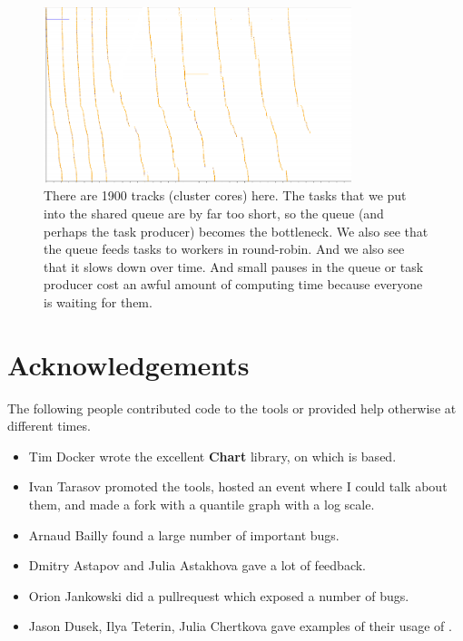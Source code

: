 \documentclass{article}
\begin{document}
\begin{figure}[p]
\center
\includegraphics[width=0.8\textwidth]{pics/splot/spray.png}
\caption{There are 1900 tracks (cluster cores) here. The tasks that we put into the shared queue are by far too short, so the queue (and perhaps the task producer) becomes the bottleneck. We also see that the queue feeds tasks to workers in round-robin. And we also see that it slows down over time. And small pauses in the queue or task producer cost an awful amount of computing time because everyone is waiting for them.}
\label{fig:splot-gallery-last}
\end{figure}

\pagebreak

\section{Acknowledgements}

The following people contributed code to the tools or provided help otherwise at different times.
\begin{itemize}
\item Tim Docker wrote the excellent \textbf{Chart} library, on which \timeplot{} is based.
\item Ivan Tarasov promoted the tools, hosted an event where I could talk about them, and made a fork with a quantile graph with a log scale.
\item Arnaud Bailly found a large number of important bugs.
\item Dmitry Astapov and Julia Astakhova gave a lot of feedback.
\item Orion Jankowski did a pullrequest which exposed a number of bugs.
\item Jason Dusek, Ilya Teterin, Julia Chertkova gave examples of their usage of \timeplot{}.
\end{itemize}
\end{document}
